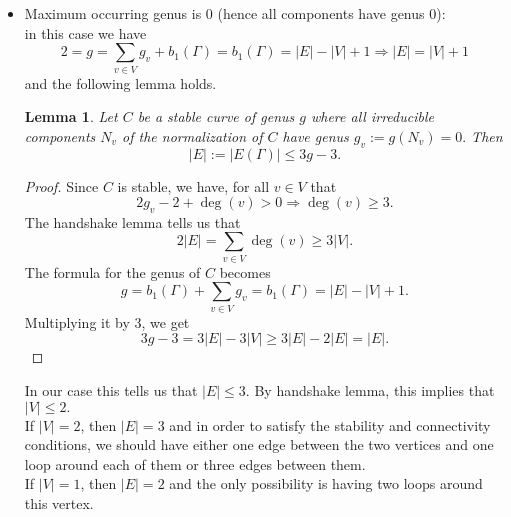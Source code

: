 \documentclass[a4paper,12 pt,titlepage,twoside]{book}
\theoremstyle{plain}
\theoremstyle{theorem}
\newtheorem{lemma}[thm]{Lemma}
\theoremstyle{definition}
\theoremstyle{remark}
\begin{document}
\begin{itemize}
		Suppose now that we have only one vertex $v_0$ of weight 1 and the other vertices of $\Gamma$ have weight 0. Then $b_1(\Gamma)= 1 \Rightarrow |E| = |V|$, $\deg(v_0)\ge 1$ and the handshake lemma implies that $$\begin{aligned} 2|V| = 2|E| &= \sum_{v \in V} \deg(v)  \ge \deg(v_0) + 3(|V|-1)  \ge 1 + 3|V|-3 = 3|V| -2 \\  &\Rightarrow 3|V| -2 \le 2|V| \Rightarrow  |V| \le 2.\end{aligned}$$ If $|V|=1 =|E|$, we have no choice other than a graph with vertex $v_0$ and one loop around $v_0$.\\ If $|V|=2=|E|$, we have two vertices, $v_0$ and $v$, one edge between them ($\Gamma$ must be connected) and, since $\deg(v) \ge 3$, the other edge must be a loop around $v$. %
		\item Maximum occurring genus is 0 (hence all components have genus 0):\\ in this case we have $$2=g = \sum_{v \in V} g_v + b_1(\Gamma) = b_1(\Gamma) = |E|-|V|+1 \Rightarrow |E| = |V|+1$$ and the following lemma holds.
		\begin{lemma}
			Let $C$ be a stable curve of genus $g$ where all irreducible components $N_v$ of the normalization of $C$ have genus $g_v:= g(N_v)=0.$ Then $$|E| := |E(\Gamma)| \le 3g-3.$$
		\end{lemma}
		\begin{proof}
			Since $C$ is stable, we have, for all $v \in V$ that $$2g_v -2 + \deg(v) >0 \Rightarrow \deg(v) \ge 3.$$ The handshake lemma tells us that $$2|E| = \sum_{v \in V} \deg(v) \ge 3|V|.$$ The formula for the genus of $C$ becomes $$g = b_1(\Gamma) + \sum_{v \in V} g_v = b_1(\Gamma) = |E| - |V| +1.$$ Multiplying it by 3, we get $$3g -3 = 3|E| - 3|V| \ge 3|E| - 2|E| = |E|.$$
		\end{proof}
		In our case this tells us that $|E| \le 3.$ By handshake lemma, this implies that $|V| \le 2.$ \\If $|V|=2$, then $|E|=3$ and in order to satisfy the stability and connectivity conditions, we should have either one edge between the two vertices and one loop around each of them or three edges between them.\\
		If $|V|=1$, then $|E|=2$ and the only possibility is having two loops around this vertex. %
	\end{itemize}
	
\end{document}
